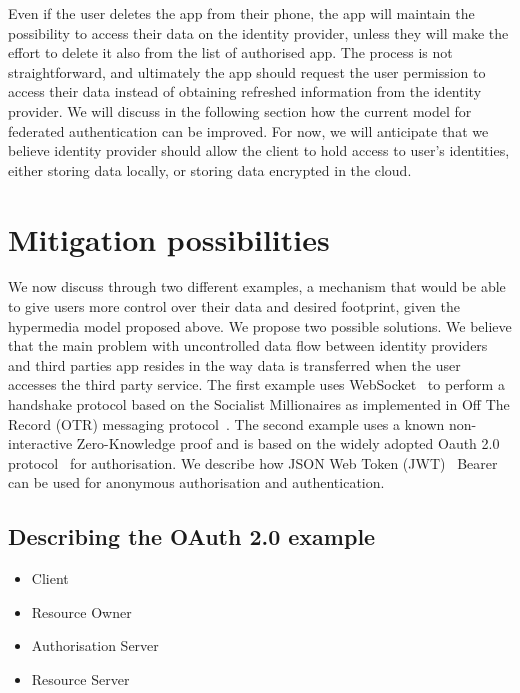 Even if the user deletes the app from their phone, the app will maintain the possibility to access their data on the identity provider, unless they will make the effort to delete it also from the list of authorised app. The process is not straightforward, and ultimately the app should request the user permission to access their data instead of obtaining refreshed information from the identity provider.
We will discuss in the following section how the current model for federated authentication can be improved. For now, we will anticipate that we believe identity provider should allow the client to hold access to user's identities, either storing data locally, or storing data encrypted in the cloud.

\section{Mitigation possibilities}

We now discuss through two different examples, a mechanism that would be able to give users more control over their data and desired footprint, given the hypermedia model proposed above. We propose two possible solutions. 
We believe that the main problem with uncontrolled data flow between identity providers and third parties app resides in the way data is transferred when the user accesses the third party service.
The first example uses WebSocket~\cite{fetterfc} to perform a handshake protocol based on the Socialist Millionaires as implemented in Off The Record (OTR) messaging protocol~\cite{goldberg2012off}. The second example uses a known non-interactive Zero-Knowledge proof and is based on the widely adopted Oauth 2.0 protocol~\cite{hardt2012oauth} for authorisation. We describe how JSON Web Token (JWT)~\cite{jones2015json} Bearer can be used for anonymous authorisation and authentication.

\subsection{Describing the OAuth 2.0 example}

\begin{itemize}
    \item Client
    \item Resource Owner
    \item Authorisation Server
    \item Resource Server
\end{itemize}


